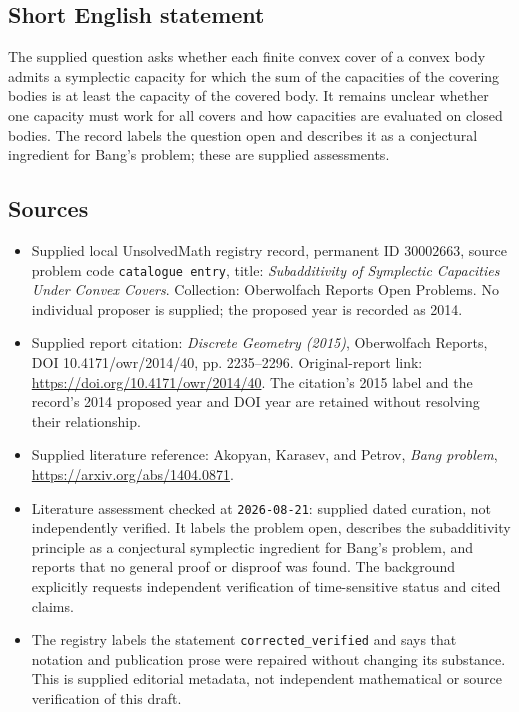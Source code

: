 \documentclass[11pt]{article}
\begin{document}
\subsection{Short English statement}
The supplied question asks whether each finite convex cover of a convex body admits a symplectic capacity for which the sum of the capacities of the covering bodies is at least the capacity of the covered body. It remains unclear whether one capacity must work for all covers and how capacities are evaluated on closed bodies. The record labels the question open and describes it as a conjectural ingredient for Bang's problem; these are supplied assessments.
\subsection{Sources}
\begin{itemize}
\item Supplied local UnsolvedMath registry record, permanent ID \(30002663\), source problem code \texttt{catalogue entry}, title: \emph{Subadditivity of Symplectic Capacities Under Convex Covers}. Collection: Oberwolfach Reports Open Problems. No individual proposer is supplied; the proposed year is recorded as 2014.
\item Supplied report citation: \emph{Discrete Geometry (2015)}, Oberwolfach Reports, DOI 10.4171/owr/2014/40, pp. 2235--2296. Original-report link: \url{https://doi.org/10.4171/owr/2014/40}. The citation's 2015 label and the record's 2014 proposed year and DOI year are retained without resolving their relationship.
\item Supplied literature reference: Akopyan, Karasev, and Petrov, \emph{Bang problem}, \url{https://arxiv.org/abs/1404.0871}.
\item Literature assessment checked at \texttt{2026-08-21}: supplied dated curation, not independently verified. It labels the problem open, describes the subadditivity principle as a conjectural symplectic ingredient for Bang's problem, and reports that no general proof or disproof was found. The background explicitly requests independent verification of time-sensitive status and cited claims.
\item The registry labels the statement \texttt{corrected\_verified} and says that notation and publication prose were repaired without changing its substance. This is supplied editorial metadata, not independent mathematical or source verification of this draft.
\end{itemize}
\end{document}
